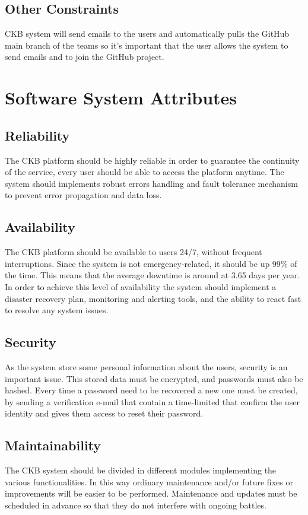 \subsection{Other Constraints}
CKB system will send emails to the users and automatically pulls the GitHub main branch of the teams so it's important that the user allows the system to send emails and to join the GitHub project.

\section{Software System Attributes}
\subsection{Reliability}
The CKB platform should be highly reliable in order to guarantee the continuity of the service, every user should be able to access the platform anytime. The system should implements robust errors handling and fault tolerance mechanism to prevent error propagation and data loss. \subsection{Availability}
The CKB platform should be available to users 24/7, without frequent interruptions. 
Since the system is not emergency-related, it should be up 99\% of the time.
This means that the average downtime is around at 3.65 days per year. \newline
In order to achieve this level of availability the system should implement a disaster recovery plan, monitoring and alerting tools, and the ability to react fast to resolve any system issues.
\subsection{Security}
As the system store some personal information about the users, security is an important issue. This stored data must be encrypted, and passwords must also be hashed. \newline
Every time a password need to be recovered a new one must be created, by sending a verification e-mail that contain a time-limited that confirm the user identity and gives them access to reset their password.
\subsection{Maintainability}
The CKB system should be divided in different modules implementing the various functionalities. In this way ordinary maintenance and/or future fixes or improvements will be easier to be performed. \newline
Maintenance and updates must be scheduled in advance so that they do not interfere with ongoing battles. 
